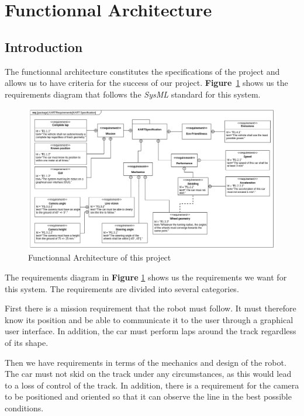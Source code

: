 \section{Functionnal Architecture}

\subsection{Introduction}
The functionnal architecture constitutes the specifications of the project and allows us to have criteria
for the success of our project. \textbf{Figure}~\ref{fig:requirement} shows us the requirements
diagram that follows the \textit{SysML} standard for this system.

\begin{figure}[!ht]
    \begin{center}
        \includegraphics[width=\textwidth]{Images/requirement.png}
    \end{center}
    \caption{Functionnal Architecture of this project}
    \label{fig:requirement}
\end{figure}

The requirements diagram in \textbf{Figure} \ref{fig:requirement} shows us the requirements we want for this system. The requirements are divided into several categories.

First there is a mission requirement that the robot must follow. It must therefore know its position and be able to communicate it to the user through a graphical user interface. In addition, the car must perform laps around the track regardless of its shape.

Then we have requirements in terms of the mechanics and design of the robot. The car must not skid on the track under any circumstances, as this would lead to a loss of control of the track. In addition, there is a requirement for the camera to be positioned and oriented so that it can observe the line in the best possible conditions.

